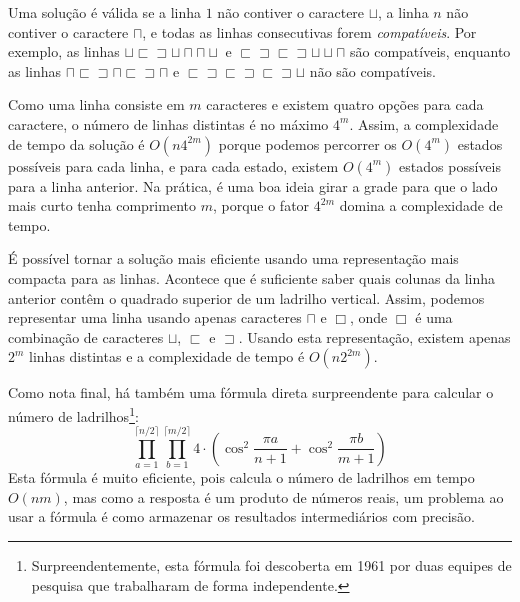 Uma solução é válida se a linha $1$ não contiver
o caractere $\sqcup$,
a linha $n$ não contiver o caractere $\sqcap$,
e todas as linhas consecutivas forem \emph{compatíveis}.
Por exemplo, as linhas
$\sqcup \sqsubset \sqsupset \sqcup \sqcap \sqcap \sqcup$ e
$\sqsubset \sqsupset \sqsubset \sqsupset \sqcup \sqcup \sqcap$ 
são compatíveis, enquanto as linhas
$\sqcap \sqsubset \sqsupset \sqcap \sqsubset \sqsupset \sqcap$ e
$\sqsubset \sqsupset \sqsubset \sqsupset \sqsubset \sqsupset \sqcup$
não são compatíveis.

Como uma linha consiste em $m$ caracteres e existem
quatro opções para cada caractere, o número de linhas distintas
é no máximo $4^m$.
Assim, a complexidade de tempo da solução é
$O(n 4^{2m})$ porque podemos percorrer os
$O(4^m)$ estados possíveis para cada linha,
e para cada estado, existem $O(4^m)$
estados possíveis para a linha anterior.
Na prática, é uma boa ideia girar a grade
para que o lado mais curto tenha comprimento $m$,
porque o fator $4^{2m}$ domina a complexidade de tempo.

É possível tornar a solução mais eficiente
usando uma representação mais compacta para as linhas.
Acontece que é suficiente saber quais
colunas da linha anterior contêm o quadrado superior
de um ladrilho vertical.
Assim, podemos representar uma linha usando apenas caracteres
$\sqcap$ e $\Box$, onde $\Box$ é uma combinação
de caracteres
$\sqcup$, $\sqsubset$ e $\sqsupset$.
Usando esta representação, existem apenas
$2^m$ linhas distintas e a complexidade de tempo é
$O(n 2^{2m})$.

Como nota final, há também uma fórmula direta surpreendente
para calcular o número de ladrilhos\footnote{Surpreendentemente,
esta fórmula foi descoberta em 1961 por duas equipes de pesquisa \cite{kas61,tem61}
que trabalharam de forma independente.}:
\[ \prod_{a=1}^{\lceil n/2 \rceil} \prod_{b=1}^{\lceil m/2 \rceil} 4 \cdot (\cos^2 \frac{\pi a}{n + 1} + \cos^2 \frac{\pi b}{m+1})\]
Esta fórmula é muito eficiente, pois calcula
o número de ladrilhos em tempo $O(nm)$,
mas como a resposta é um produto de números reais,
um problema ao usar a fórmula é
como armazenar os resultados intermediários com precisão.
